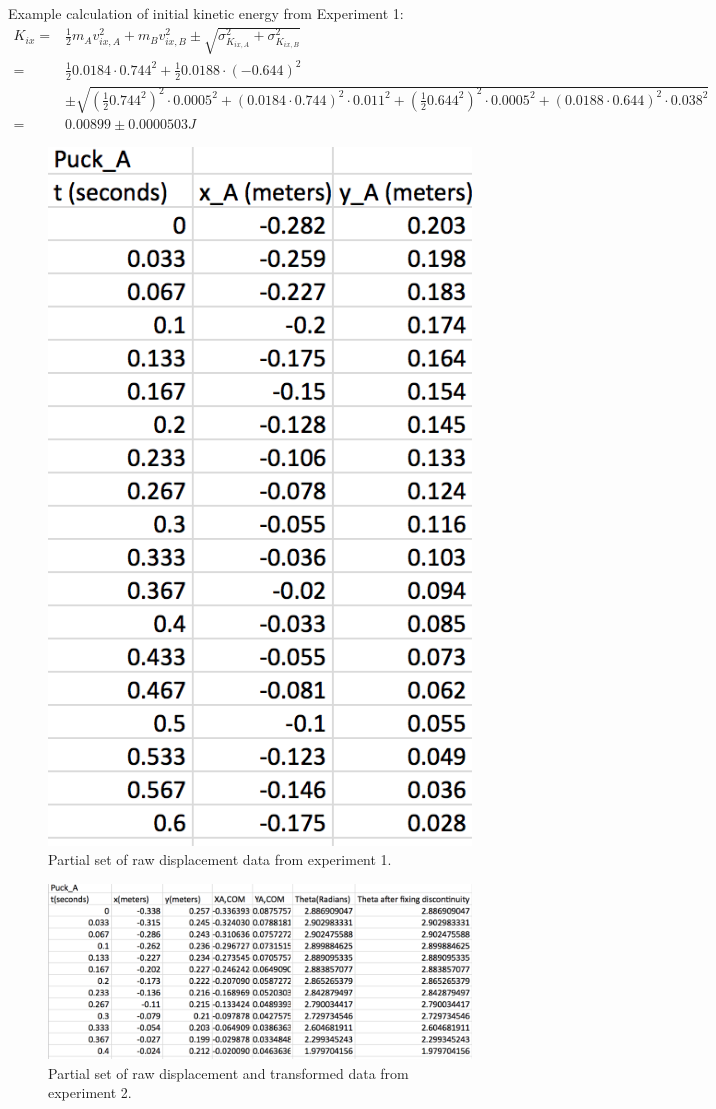 \documentclass[11pt]{article}
\begin{document}
Example calculation of initial kinetic energy from Experiment 1:\\
\begin{align*}
K_{ix} =& \frac{1}{2}m_A v_{ix,A}^2 + m_B v_{ix,B}^2 \pm \sqrt{\sigma_{K_{ix,A}}^2+\sigma_{K_{ix,B}}^2} \\
=& \frac{1}{2}0.0184\cdot0.744^2 + \frac{1}{2}0.0188\cdot(-0.644)^2 \\
&\pm \sqrt{(\frac{1}{2}0.744^2)^2\cdot0.0005^2+(0.0184\cdot0.744)^2\cdot0.011^2+(\frac{1}{2}0.644^2)^2\cdot0.0005^2+(0.0188\cdot0.644)^2\cdot0.038^2} \\
=& 0.00899\pm0.0000503 J
\end{align*}


\begin{figure}[h]
\centering
\includegraphics[width=.4\textwidth]{exp1.png}
\caption{Partial set of raw displacement data from experiment 1.}
\end{figure}

\begin{figure}[h]
\centering
\includegraphics[width=.8\textwidth]{exp2.png}
\caption{Partial set of raw displacement and transformed data from experiment 2.}
\end{figure}
\end{document}
